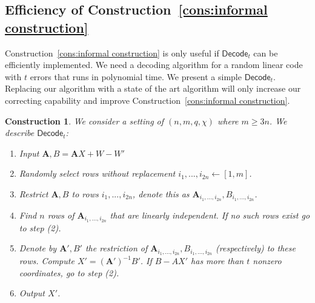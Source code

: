 \documentclass[11pt]{article}
\newcommand{\consref}[1]{\mbox{Construction~\ref{#1}}}
\newcommand{\class}[1]{{\ensuremath{\mathsf{#1}}}}
\newcommand{\rep}{\ensuremath{\class{Rep}}\xspace}
\newcommand{\vect}[1]{\ensuremath{\textbf{#1}}}
\newcommand{\Fq}{\ensuremath{\mathbb{F}_q}}
\newcommand{\sample}{\ensuremath{\class{Sample}}\xspace}
\newcommand{\decode}{\ensuremath{\mathsf{Decode}}}
\newtheorem{construction}[theorem]{Construction}
\newcommand{\vA}{\vect{A}}
\begin{document}

\subsection{Efficiency of \consref{cons:informal construction}}
\label{sec:time main construction}
\consref{cons:informal construction} is only useful if $\decode_t$ can be efficiently implemented.  We need a decoding algorithm for a random linear code with $t$ errors that runs in polynomial time.  We present a simple $\decode_t$.  Replacing our algorithm  with a state of the art algorithm will only increase our correcting capability and improve \consref{cons:informal construction}.

\begin{construction}
\label{cons:decoding algorithm} We consider a setting of $(n, m, q, \chi)$ where $m\geq 3n$.  We describe $\decode_t$:
\begin{enumerate}
\item Input $\vA , B = \vA X + W - W'$
\item Randomly select rows without replacement $i_1,..., i_{2n}\leftarrow [1,m]$.  
\item Restrict $\vA, B$ to rows $i_1,...,i_{2n}$, denote this as $\vA_{i_1,...,i_{2n}}, B_{i_1,...,i_{2n}}$.
\item Find $n$ rows of $\vA_{i_1,..., i_{2n}}$ that are linearly independent.  
If no such rows exist go to step (2).
\item Denote by $\vA', B'$ the restriction of $\vA_{i_1,..., i_{2n}}, B_{i_1,..., i_{2n}}$ (respectively) to these rows. Compute $X' = (\vA')^{-1}B'$.  If $B- AX'$ has more than $t$ nonzero coordinates, go to step (2).
\item Output $X'$.
\end{enumerate}
\end{construction}
\end{document}

